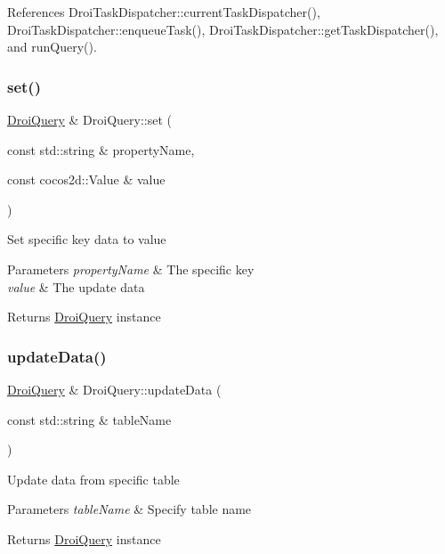 References Droi\+Task\+Dispatcher\+::current\+Task\+Dispatcher(), Droi\+Task\+Dispatcher\+::enqueue\+Task(), Droi\+Task\+Dispatcher\+::get\+Task\+Dispatcher(), and run\+Query().

\mbox{\label{class_droi_query_aaafee9ca08910f2ce683f1aed2d34b82}} 
\subsubsection{\texorpdfstring{set()}{set()}}
{\footnotesize\ttfamily \hyperlink{class_droi_query}{Droi\+Query} \& Droi\+Query\+::set (\begin{DoxyParamCaption}\item[{const std\+::string \&}]{property\+Name,  }\item[{const cocos2d\+::\+Value \&}]{value }\end{DoxyParamCaption})}

Set specific key data to value 
\begin{DoxyParams}{Parameters}
{\em property\+Name} & The specific key \\
\hline
{\em value} & The update data \\
\hline
\end{DoxyParams}
\begin{DoxyReturn}{Returns}
\hyperlink{class_droi_query}{Droi\+Query} instance 
\end{DoxyReturn}
\mbox{\label{class_droi_query_afdc95a33d53f45202117d308a0c41b46}} 
\subsubsection{\texorpdfstring{update\+Data()}{updateData()}}
{\footnotesize\ttfamily \hyperlink{class_droi_query}{Droi\+Query} \& Droi\+Query\+::update\+Data (\begin{DoxyParamCaption}\item[{const std\+::string \&}]{table\+Name }\end{DoxyParamCaption})}

Update data from specific table 
\begin{DoxyParams}{Parameters}
{\em table\+Name} & Specify table name \\
\hline
\end{DoxyParams}
\begin{DoxyReturn}{Returns}
\hyperlink{class_droi_query}{Droi\+Query} instance 
\end{DoxyReturn}
\mbox{\label{class_droi_query_ad58c1c5279ac424afc65fc0703be7f94}} 
